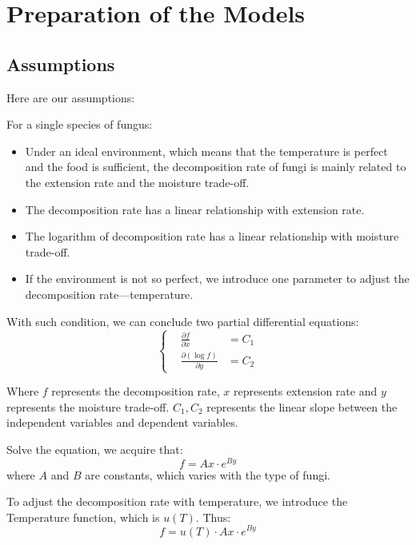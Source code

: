 \documentclass{mcmthesis}
\begin{document}
\section{Preparation of the Models}
\subsection{Assumptions}
Here are our assumptions:

For a single species of fungus\cite{Lustenhouwer11551}:
\begin{itemize}
  \item Under an ideal environment, which means that the temperature is perfect and the food is sufficient, the decomposition rate of fungi is mainly related to the extension rate and the moisture trade-off.
  \item The decomposition rate has a linear relationship with extension rate.
  \item The logarithm of decomposition rate has a linear relationship with moisture trade-off.
  \item If the environment is not so perfect, we introduce one parameter to adjust the decomposition rate---temperature.
\end{itemize}

With such condition, we can conclude two partial differential equations:
\begin{equation}
  \left\{
  \begin{aligned}
  &\frac{\partial f}{\partial x}&=C_1\\
  &\frac{\partial (\log f)}{\partial y}&=C_2
  \end{aligned}
  \right.
\end{equation}

Where $f$ represents the decomposition rate, $x$ represents extension rate and $y$ represents the moisture trade-off.
$C_1,C_2$ represents the linear slope between the independent variables and dependent variables.

Solve the equation, we acquire that:
\begin{equation}
  f=Ax\cdot e^{By}
\end{equation}
where $A$ and $B$ are constants, which varies with the type of fungi.

To adjust the decomposition rate with temperature, we introduce the Temperature function, which is $u(T)$.
Thus:
\begin{equation}
  f=u(T)\cdot Ax\cdot e^{By}
\end{equation}
\end{document}
